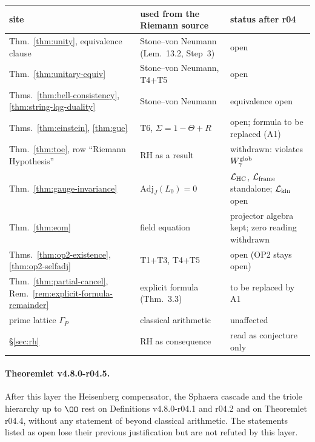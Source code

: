 \begin{center}
\small
\begin{tabular}{@{}>{\raggedright\arraybackslash}p{}>{\raggedright\arraybackslash}p{}>{\raggedright\arraybackslash}p{}@{}}
\toprule
site & used from the Riemann source & status after r04\\
\midrule
Thm.~\ref{thm:unity}, equivalence clause & Stone--von Neumann (Lem.~13.2, Step~3) & open\\
Thm.~\ref{thm:unitary-equiv} & Stone--von Neumann, T4+T5 & open\\
Thms.~\ref{thm:bell-consistency}, \ref{thm:string-lqg-duality} & Stone--von Neumann & equivalence open\\
Thms.~\ref{thm:einstein}, \ref{thm:gue} & T6, \(\Sigma=1-\Theta+R\) & open; formula to be replaced (A1)\\
Thm.~\ref{thm:toe}, row ``Riemann Hypothesis'' & RH as a result & withdrawn: violates \(W_\gamma^{\rm glob}\)\\
Thm.~\ref{thm:gauge-invariance} & \(\mathrm{Adj}_J(L_0)=0\) & \(\mathcal L_{\rm HC}\), \(\mathcal L_{\rm frame}\) standalone; \(\mathcal L_{\rm kin}\) open\\
Thm.~\ref{thm:eom} & field equation & projector algebra kept; zero reading withdrawn\\
Thms.~\ref{thm:op2-existence}, \ref{thm:op2-selfadj} & T1+T3, T4+T5 & open (OP2 stays open)\\
Thm.~\ref{thm:partial-cancel}, Rem.~\ref{rem:explicit-formula-remainder} & explicit formula (Thm.~3.3) & to be replaced by A1\\
prime lattice \(\Gamma_P\) & classical arithmetic & unaffected\\
\S\ref{sec:rh} & RH as consequence & read as conjecture only\\
\bottomrule
\end{tabular}
\end{center}

\paragraph{Theoremlet v4.8.0-r04.5.}
After this layer the Heisenberg compensator, the Sphaera cascade and the triole hierarchy up to
\(\OO\) rest on Definitions v4.8.0-r04.1 and r04.2 and on Theoremlet r04.4, without any statement
of \cite{brendecke2026rh} beyond classical arithmetic.  The statements listed as open lose their
previous justification but are not refuted by this layer.


